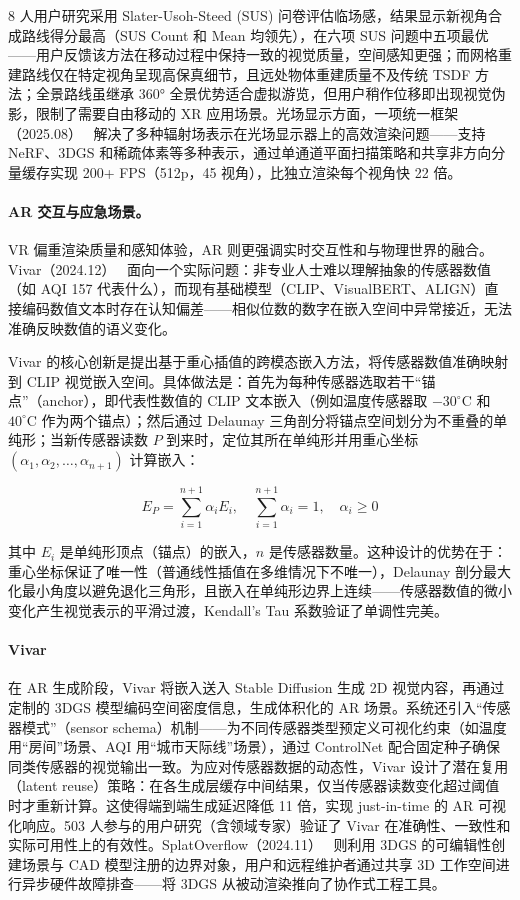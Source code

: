 8 人用户研究采用 Slater-Usoh-Steed (SUS) 问卷评估临场感，结果显示新视角合成路线得分最高（SUS Count 和 Mean 均领先），在六项 SUS 问题中五项最优——用户反馈该方法在移动过程中保持一致的视觉质量，空间感知更强；而网格重建路线仅在特定视角呈现高保真细节，且远处物体重建质量不及传统 TSDF 方法；全景路线虽继承 360° 全景优势适合虚拟游览，但用户稍作位移即出现视觉伪影，限制了需要自由移动的 XR 应用场景。光场显示方面，一项统一框架（2025.08）~\cite{2508_18540} 解决了多种辐射场表示在光场显示器上的高效渲染问题——支持 NeRF、3DGS 和稀疏体素等多种表示，通过单通道平面扫描策略和共享非方向分量缓存实现 200+ FPS（512p，45 视角），比独立渲染每个视角快 22 倍。

\paragraph{AR 交互与应急场景。}

VR 偏重渲染质量和感知体验，AR 则更强调实时交互性和与物理世界的融合。Vivar（2024.12）~\cite{2412_13509} 面向一个实际问题：非专业人士难以理解抽象的传感器数值（如 AQI 157 代表什么），而现有基础模型（CLIP、VisualBERT、ALIGN）直接编码数值文本时存在认知偏差——相似位数的数字在嵌入空间中异常接近，无法准确反映数值的语义变化。

Vivar 的核心创新是提出基于重心插值的跨模态嵌入方法，将传感器数值准确映射到 CLIP 视觉嵌入空间。具体做法是：首先为每种传感器选取若干“锚点”（anchor），即代表性数值的 CLIP 文本嵌入（例如温度传感器取 $-30^\circ$C 和 $40^\circ$C 作为两个锚点）；然后通过 Delaunay 三角剖分将锚点空间划分为不重叠的单纯形；当新传感器读数 $P$ 到来时，定位其所在单纯形并用重心坐标 $(\alpha_1, \alpha_2, \ldots, \alpha_{n+1})$ 计算嵌入：

\begin{equation}
E_P = \sum_{i=1}^{n+1} \alpha_i E_i, \quad \sum_{i=1}^{n+1} \alpha_i = 1, \quad \alpha_i \geq 0
\end{equation}

其中 $E_i$ 是单纯形顶点（锚点）的嵌入，$n$ 是传感器数量。这种设计的优势在于：重心坐标保证了唯一性（普通线性插值在多维情况下不唯一），Delaunay 剖分最大化最小角度以避免退化三角形，且嵌入在单纯形边界上连续——传感器数值的微小变化产生视觉表示的平滑过渡，Kendall's Tau 系数验证了单调性完美。

\paragraph{Vivar}
在 AR 生成阶段，Vivar 将嵌入送入 Stable Diffusion 生成 2D 视觉内容，再通过定制的 3DGS 模型编码空间密度信息，生成体积化的 AR 场景。系统还引入“传感器模式”（sensor schema）机制——为不同传感器类型预定义可视化约束（如温度用“房间”场景、AQI 用“城市天际线”场景），通过 ControlNet 配合固定种子确保同类传感器的视觉输出一致。为应对传感器数据的动态性，Vivar 设计了潜在复用（latent reuse）策略：在各生成层缓存中间结果，仅当传感器读数变化超过阈值时才重新计算。这使得端到端生成延迟降低 11 倍，实现 just-in-time 的 AR 可视化响应。503 人参与的用户研究（含领域专家）验证了 Vivar 在准确性、一致性和实际可用性上的有效性。SplatOverflow（2024.11）~\cite{2411_02332} 则利用 3DGS 的可编辑性创建场景与 CAD 模型注册的边界对象，用户和远程维护者通过共享 3D 工作空间进行异步硬件故障排查——将 3DGS 从被动渲染推向了协作式工程工具。

